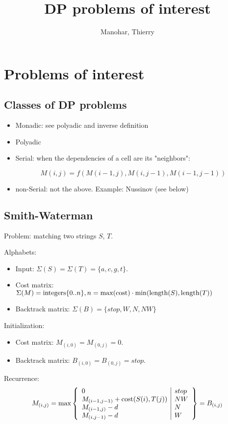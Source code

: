 \documentclass[11pt]{article}
\title{DP problems of interest}
\author{Manohar, Thierry}
\date{}
\def\ul{\begin{itemize}}
\def\ule{\end{itemize}}
\begin{document}
\maketitle
\pagestyle{headings}

\section{Problems of interest}

\subsection{Classes of DP problems}

\ul
\item Monadic: see polyadic and inverse definition
\item Polyadic
\item Serial: when the dependencies of a cell are its "neighbors": 

\[ M(i,j) = f(M(i-1,j), M(i, j-1), M(i-1,j-1)) \]

\item non-Serial: not the above. Example: Nussinov (see below)
\ule

\subsection{Smith-Waterman}
Problem: matching two strings $S$, $T$.

Alphabets:\ul
\item Input: $\Sigma(S)=\Sigma(T)=\{a,c,g,t\}$.
\item Cost matrix: $\Sigma(M) = {\rm integers} \{0..n\}, n=\max({\rm cost}) \cdot \min({\rm length}(S),{\rm length}(T))$
\item Backtrack matrix: $\Sigma(B)=\{stop,W,N,NW\}$
\ule

Initialization:\ul
\item Cost matrix: $M_{(i,0)}=M_{(0,j)}=0$.
\item Backtrack matrix: $B_{(i,0)}=B_{(0,j)}=stop$.
\ule

Recurrence:
\[M_{(i,j)}=\max\left\{\begin{array}{l|l}
	0 & stop\\
	M_{(i-1,j-1)}+{\rm cost}(S(i),T(j)) & NW\\
	M_{(i-1,j)}-d & N\\
	M_{(i,j-1)}-d & W
\end{array}\right\}=B_{(i,j)} \]
\end{document}
